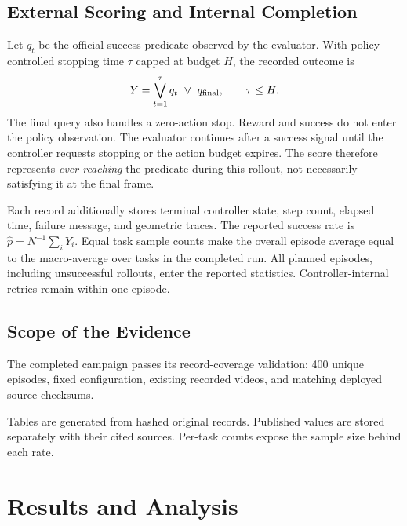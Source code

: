 \documentclass[letterpaper,10pt,conference]{ieeeconf}
\begin{document}
\subsection{External Scoring and Internal Completion}
Let $q_t$ be the official success predicate observed by the evaluator.
With policy-controlled stopping time $\tau$ capped at budget $H$, the
recorded outcome is
\begin{equation}
 Y=\bigvee_{t=1}^{\tau}q_t\ \lor\ q_{\rm final},
 \qquad \tau\leq H.
 \label{eq:score}
\end{equation}
The final query also handles a zero-action stop. Reward and success do not
enter the policy observation. The evaluator continues after a success signal
until the controller requests stopping or the action budget expires.
The score therefore represents \emph{ever reaching} the predicate during
this rollout, not necessarily satisfying it at the final frame.

Each record additionally stores terminal controller state, step count,
elapsed time, failure message, and geometric traces. The reported success rate
is $\widehat p=N^{-1}\sum_iY_i$. Equal task sample counts make the overall
episode average equal to the macro-average over tasks in the completed run.
All planned episodes, including unsuccessful rollouts, enter the reported
statistics. Controller-internal retries remain within one episode.

\subsection{Scope of the Evidence}

The completed campaign passes its record-coverage validation: 400 unique
episodes, fixed configuration, existing recorded videos, and matching
deployed source checksums.

Tables are generated from hashed original records. Published values are
stored separately with their cited sources. Per-task counts expose the
sample size behind each rate.

\begin{table}[t]
\caption{External ever-success counts and execution cost.
$^\dagger$Elapsed-time medians include execution overhead under concurrent
evaluation. All counts, steps, and times come from the same full run.
}
\label{tab:results}
\centering
\footnotesize

\end{table}

\section{Results and Analysis}
\end{document}
